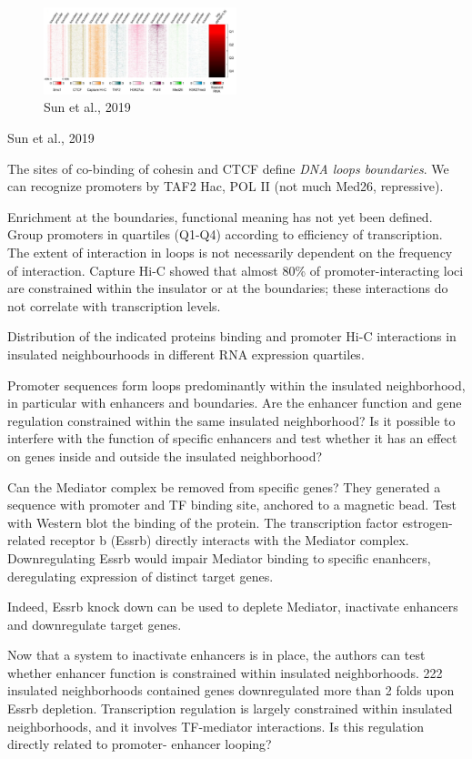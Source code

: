 \begin{figure}
\centering
\includegraphics[width=0.5\textwidth]{../_resources/Screenshot_2022-10-19_at_10-01-09.png}
\caption{Sun et al., 2019}
\end{figure}

Sun et al., 2019

The sites of co-binding of cohesin and CTCF define \emph{DNA loops boundaries}. We can recognize promoters by TAF2 Hac, POL II (not much Med26, repressive).

Enrichment at the boundaries, functional meaning has not yet been defined. Group promoters in quartiles (Q1-Q4) according to efficiency of transcription. The extent of interaction in loops is not necessarily dependent on the frequency of interaction. Capture Hi-C showed that almost 80\% of promoter-interacting loci are constrained within the insulator or at the boundaries; these interactions do not correlate with transcription levels.

Distribution of the indicated proteins binding and promoter Hi-C interactions in insulated neighbourhoods in different RNA expression quartiles.

Promoter sequences form loops predominantly within the insulated neighborhood, in particular with enhancers and boundaries. Are the enhancer function and gene regulation constrained within the same insulated neighborhood? Is it possible to interfere with the function of specific enhancers and test whether it has an effect on genes inside and outside the insulated neighborhood?

Can the Mediator complex be removed from specific genes? They generated a sequence with promoter and TF binding site, anchored to a magnetic bead. Test with Western blot the binding of the protein. The transcription factor estrogen-related receptor b (Essrb) directly interacts with the Mediator complex. Downregulating Essrb would impair Mediator binding to specific enanhcers, deregulating expression of distinct target genes.

Indeed, Essrb knock down can be used to deplete Mediator, inactivate enhancers and downregulate target genes.

Now that a system to inactivate enhancers is in place, the authors can test whether enhancer function is constrained within insulated neighborhoods. 222 insulated neighborhoods contained genes downregulated more than 2 folds upon Essrb depletion. Transcription regulation is largely constrained within insulated neighborhoods, and it involves TF-mediator interactions. Is this regulation directly related to promoter- enhancer looping?

